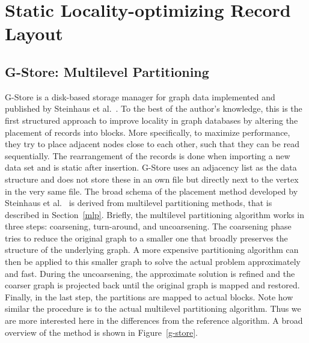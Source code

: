 \chapter{Static Locality-optimizing Record Layout}
\section{G-Store: Multilevel Partitioning}
    G-Store is a disk-based storage manager for graph data implemented and published by Steinhaus et al.~\autocite{steinhaus2010g}. 
    To the best of the author's knowledge, this is the first structured approach to improve locality in graph databases by altering the placement of records into blocks.
    More specifically, to maximize performance, they try to place adjacent nodes close to each other, such that they can be read sequentially. 
    The rearrangement of the records is done when importing a new data set and is static after insertion.
    G-Store uses an adjacency list as the data structure and does not store these in an own file but directly next to the vertex in the very same file.
    The broad schema of the placement method developed by Steinhaus et al.~\autocite{steinhaus2010g} is derived from multilevel partitioning methods, that is described in Section~\ref{mlp}.
    Briefly, the multilevel partitioning algorithm works in three steps: coarsening, turn-around, and uncoarsening. 
    The coarsening phase tries to reduce the original graph to a smaller one that broadly preserves the structure of the underlying graph. 
    A more expensive partitioning algorithm can then be applied to this smaller graph to solve the actual problem approximately and fast.
    During the uncoarsening, the approximate solution is refined and the coarser graph is projected back until the original graph is mapped and restored.
    Finally, in the last step, the partitions are mapped to actual blocks.
    Note how similar the procedure is to the actual multilevel partitioning algorithm. 
    Thus we are more interested here in the differences from the reference algorithm.
    A broad overview of the method is shown in Figure~\ref{g-store}.
    
